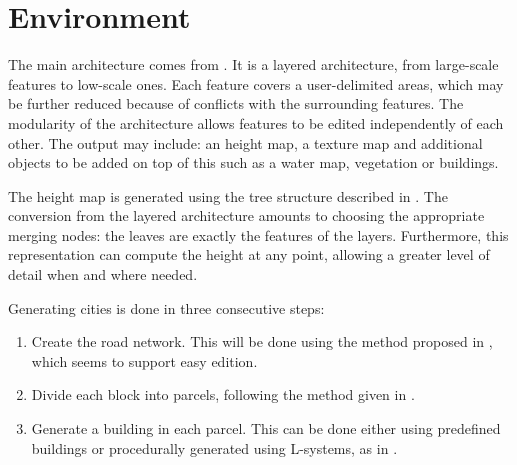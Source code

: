 \section{Environment}

The main architecture comes from \cite{DeclarativeArchitecture}. It is a
layered architecture, from large-scale features to low-scale ones. Each feature
covers a user-delimited areas, which may be further reduced because of
conflicts with the surrounding features. The modularity of the architecture
allows features to be edited independently of each other. The output may
include: an height map, a texture map and additional objects to be added on top
of this such as a water map, vegetation or buildings.

The height map is generated using the tree structure described in
\cite{FeatureTree}. The conversion from the layered architecture amounts to
choosing the appropriate merging nodes: the leaves are exactly the features of
the layers. Furthermore, this representation can compute the height at any
point, allowing a greater level of detail when and where needed.

Generating cities is done in three consecutive steps: \begin{enumerate}
  \item Create the road network. This will be done using the method proposed in
    \cite{StreetTensors}, which seems to support easy edition.
  \item Divide each block into parcels, following the method given in
    \cite{PGParcels}.
  \item Generate a building in each parcel. This can be done either using
    predefined buildings or procedurally generated using L-systems, as in
    \cite{FLSystem}.
\end{enumerate}
